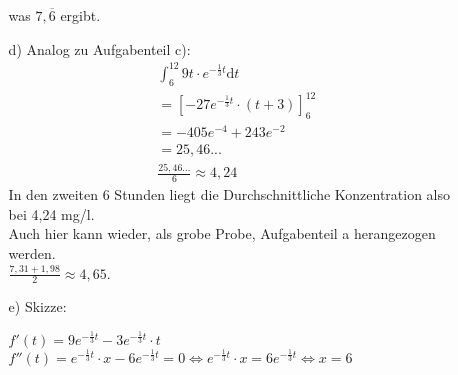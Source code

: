 \documentclass[a4paper,11pt]{article}
\begin{document}
\begin{enumerate}
\begin{enumerate}
                    was $7, \overline{6}$ ergibt.
                \item[d)]
                    Analog zu Aufgabenteil c):\\
                    \begin{align*}
                        \int_6^12 9t \cdot e^{-\frac{1}{3}t} \mathrm{d}t\\
                        = [-27 e^{-\frac{1}{3}t} \cdot (t+3)]_6^12\\
                        = -405 e^{-4} + 243 e^{-2} \\
                        = 25,46...\\
                        \frac{25,46...}{6} \approx 4,24
                    \end{align*}
                    In den zweiten 6 Stunden liegt die Durchschnittliche Konzentration also bei 4,24 mg/l.\\
                    Auch hier kann wieder, als grobe Probe, Aufgabenteil a herangezogen werden.\\
                    $\frac{7,31+1,98}{2} \approx 4,65$.
                \item[e)]
                    Skizze:\\
                    \( f'(t)=9e^{-\frac{1}{3}t} - 3e^{-\frac{1}{3}t} \cdot t \)\\
                    \( f''(t)= e^{-\frac{1}{3}t} \cdot x - 6e^{-\frac{1}{3}t} = 0
                    \Leftrightarrow e^{-\frac{1}{3}t} \cdot x = 6e^{-\frac{1}{3}t} \Leftrightarrow x=6 \)
            \end{enumerate}


\end{enumerate}
\end{document}
